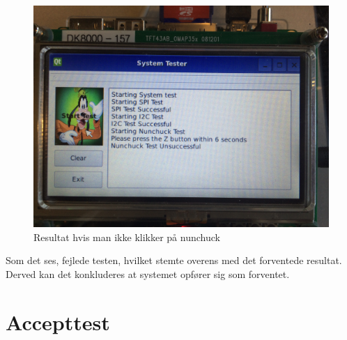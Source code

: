\begin{figure}[H]
	\centering
	\includegraphics[width=\textwidth]{Test/images/IntegrationstestProtokoller/resultat1}
	\caption{Resultat hvis man ikke klikker på nunchuck}
	\label{figure:integrationstestresult1}
\end{figure}

Som det ses, fejlede testen, hvilket stemte overens med det forventede resultat. Derved kan det konkluderes at systemet opfører sig som forventet.

\section{Accepttest}